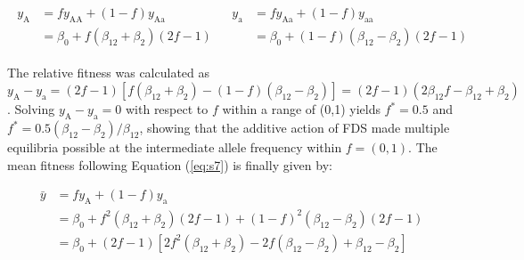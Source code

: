 \documentclass[12pt,]{article}
\begin{document}
\begin{subequations}
\begin{gather}
    \begin{split}
y_\mathrm{A} &= fy_\mathrm{AA} + (1-f)y_\mathrm{Aa}\\
&= \beta_0+f(\beta_{12}+\beta_2)(2f-1) \label{eq:s12a}
    \end{split}
\end{gather}
\begin{gather}
    \begin{split}
y_\mathrm{a} &= fy_\mathrm{Aa} + (1-f)y_\mathrm{aa}\\
&= \beta_0+(1-f)(\beta_{12}-\beta_2)(2f-1) \label{eq:s12b}
    \end{split}
\end{gather}
\end{subequations}

\noindent
The relative fitness was calculated as $y_\mathrm{A} - y_\mathrm{a} = (2f-1)[f(\beta_{12}+\beta_2) - (1-f)(\beta_{12}-\beta_2)] = (2f-1)(2\beta_{12}f-\beta_{12}+\beta_2)$. Solving $y_\mathrm{A} - y_\mathrm{a} = 0$ with respect to $f$ within a range of (0,1) yields $f^*=0.5$ and $f^*=0.5(\beta_{12}-\beta_2)/\beta_{12}$, showing that the additive action of FDS made multiple equilibria possible at the intermediate allele frequency within $f = (0,1)$. The mean fitness following Equation (\ref{eq:s7}) is finally given by:

\begin{equation}
\begin{split}
\bar{y} &= fy_\mathrm{A} + (1-f)y_\mathrm{a} \\
&= \beta_0 + f^2(\beta_{12}+\beta_2)(2f-1) + (1-f)^2(\beta_{12}-\beta_2)(2f-1)\\
&= \beta_0 + (2f-1)[2f^2(\beta_{12}+\beta_2)-2f(\beta_{12}-\beta_2)+\beta_{12}-\beta_2] \label{eq:s13}
\end{split}
\end{equation}
\end{document}
